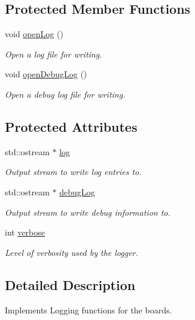 \subsection*{Protected Member Functions}
\begin{CompactItemize}
\item 
void \hyperlink{classmprace_1_1Logger_b0}{open\-Log} ()
\begin{CompactList}\small\item\em Open a log file for writing. \item\end{CompactList}\item 
void \hyperlink{classmprace_1_1Logger_b1}{open\-Debug\-Log} ()
\begin{CompactList}\small\item\em Open a debug log file for writing. \item\end{CompactList}\end{CompactItemize}
\subsection*{Protected Attributes}
\begin{CompactItemize}
\item 
std::ostream $\ast$ \hyperlink{classmprace_1_1Logger_p0}{log}
\begin{CompactList}\small\item\em Output stream to write log entries to. \item\end{CompactList}\item 
std::ostream $\ast$ \hyperlink{classmprace_1_1Logger_p1}{debug\-Log}
\begin{CompactList}\small\item\em Output stream to write debug information to. \item\end{CompactList}\item 
int \hyperlink{classmprace_1_1Logger_p2}{verbose}
\begin{CompactList}\small\item\em Level of verbosity used by the logger. \item\end{CompactList}\end{CompactItemize}


\subsection{Detailed Description}
Implements Logging functions for the boards. 


